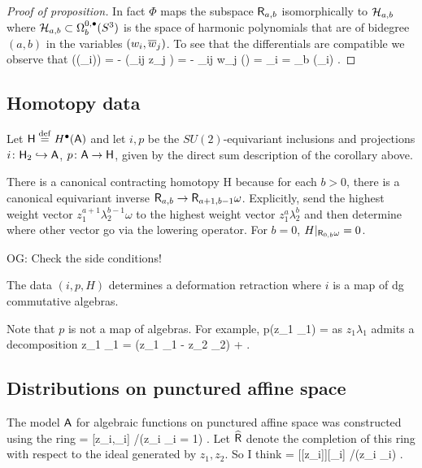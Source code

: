 \documentclass[11pt]{amsart}
\def\C{{\mathbb{C}}}
\def\owen#1{{\textcolor{violet!65!black}{OG: {#1}}}}
\begin{document}
\begin{proof}[Proof of proposition]
In fact $\Phi$ maps the subspace $\sfR_{a,b}$ isomorphically to $\cH_{a,b}$ where $\cH_{a,b} \subset \Omega^{0,\bu}_b (S^3)$ is the space of harmonic polynomials that are of bidegree $(a,b)$ in the variables $(w_i,\Bar{w}_j)$.
To see that the differentials are compatible we observe that
\beqn
\Phi(\dbar(\lambda_i)) = - \Phi(\ep_{ij} z_j \omega) = - \ep_{ij} w_j \Phi (\omega) = \xi_i = \dbar_b \Phi (\lambda_i) .
\eeqn
\end{proof}

\subsection{Homotopy data}

Let $\sfH \define H^\bu(\sfA)$ and let $i,p$ be the $SU(2)$-equivariant inclusions and projections $i \colon \sfH_2 \hookrightarrow \sfA$, $p \colon \sfA \to \sfH$, given by the direct sum description of the corollary above.

There is a canonical contracting homotopy 
\beqn
H \colon \sfA \to \sfA[-1]
\eeqn 
because for each $b > 0$, there is a canonical equivariant inverse $\sfR_{a,b} \to \sfR_{a+1,b-1} \omega$.
Explicitly, send the highest weight vector $z_1^{a+1} \lambda_2^{b-1} \omega$ to the highest weight vector $z_1^{a} \lambda_2^{b}$ and then determine where other vector go via the lowering operator.
For $b = 0$, $H|_{\sfR_{0,b}\omega} = 0$.

\owen{Check the side conditions!}

\begin{lem}
The data $(i,p,H)$ determines a deformation retraction where $i$ is a map of dg commutative algebras.
\end{lem}

Note that $p$ is not a map of algebras. 
For example,
\beqn
p(z_1 \lambda_1) = 
\eeqn
as $z_1 \lambda_1$ admits a decomposition
\beqn
z_1 \lambda_1 =  (z_1 \lambda_1 - z_2 \lambda_2) +  .
\eeqn

\subsection{Distributions on punctured affine space}

The model $\sfA$ for algebraic functions on punctured affine space was constructed using the ring
\beqn
\sfR = \C[z_i,\lambda_i] \slash (z_i \lambda_i = 1) .
\eeqn
Let $\Hat{\sfR}$ denote the completion of this ring with respect to the ideal generated by $z_1,z_2$.
So I think
\beqn
\Hat{\sfR} = \C[[z_i]][\lambda_i] \slash (z_i \lambda_i) .
\eeqn
\end{document}
